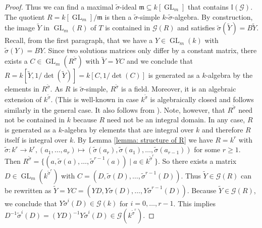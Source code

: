 \documentclass[oneside,reqno]{amsart}
\theoremstyle{definition}
\newcommand{\G}{\mathcal{G}}
\newcommand{\Gl}{\operatorname{GL}}
\newcommand{\s}{\sigma}
\begin{document}
\begin{proof}
Thus we can find a maximal ${\tilde \s}$-ideal $\mathfrak{m}\subseteq k[\Gl_m]$ that contains $\mathbb{I}(\G)$. The quotient $R=k[\Gl_m]/\mathfrak{m}$ is then a $\tilde \s$-simple $k$-${\tilde \s}$-algebra. By construction, the image $\tilde Y$ in $\Gl_m(R)$ of $T$ is contained in $\G(R)$ and satisfies $\tilde \s(\tilde Y)=B\tilde Y$. Recall, from the first paragraph, that we have a $Y\in \Gl_m(k)$ with $\tilde \s(Y)=BY$. Since two solutions matrices only differ by a constant matrix, there exists a $C\in \Gl_m(R^{\tilde \s})$ with $\tilde Y=YC$ and we conclude that $R=k[\tilde Y, 1/\det(\tilde Y)]=k[C,1/\det(C)]$ is generated as a $k$-algebra by the elements in $R^{\tilde \s}$. As $R$ is $\tilde \s$-simple, $R^{\tilde \s}$ is a field. Moreover, it is an algebraic extension of $k^{\tilde \s}$. (This is well-known in case $k^{\tilde \s}$ is algebraically closed \cite[Lemma 1.8]{SingerPut:difference} and follows similarly in the general case. It also follows from \cite[Prop. 2.11]{Wibmer:Chevalley}). Note, however, that $R^{\tilde \s}$ need not be contained in $k$ because $R$ need not be an integral domain. In any case, $R$ is generated as a $k$-algebra by elements that are integral over $k$ and therefore $R$ itself is integral over $k$. By Lemma \ref{lemma: structure of R} we have 
$R= k^r$ with $\tilde \s\colon k^r\to k^r, (a_1,\dots,a_r)\mapsto (\tilde \s(a_r),\tilde \s(a_1),\dots,\tilde \s(a_{r-1}))$ for some $r\geq 1$. Then $R^{\tilde \s}=\{(a,\tilde\s(a),\dots, \tilde \s^{r-1}(a) ) \mid a \in k^{{\tilde \s}^r}\}$. So there exists a matrix $D \in\Gl_m(k^{{\tilde \s}^r})$ with $C=(D,\tilde \s(D),\dots,\tilde \s^{r-1}(D))$. Thus $\tilde Y \in \G(R)$ can be rewritten as $\tilde Y=YC=(YD,Y\tilde \s(D),\dots,Y\tilde \s^{r-1}(D))$. Because $\tilde Y\in\G(R)$, we conclude that $Y\tilde \s^i(D) \in \G(k)$ for $i=0,\ldots,{r-1}$. This implies $D^{-1}\tilde \s^i(D)=(YD)^{-1}Y\tilde \s^i(D) \in \G(k^{{\tilde \s}^r})$.


\end{proof}
\end{document}
